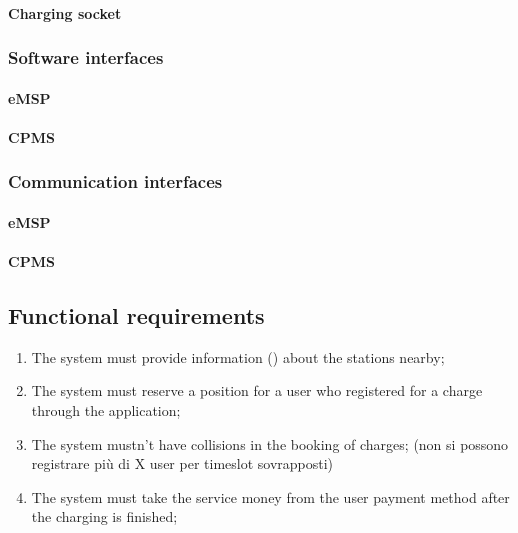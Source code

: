 \paragraph{\ac{Charging socket}}


\subsubsection{Software interfaces}
\paragraph{\ac{eMSP}}
\paragraph{\ac{CPMS}}

\subsubsection{Communication interfaces}
\paragraph{\ac{eMSP}}
\paragraph{\ac{CPMS}}

\subsection{Functional requirements}

\begin{enumerate}[label=\textbf{R\arabic*}]
    \item The system must provide information () about the stations nearby;
    \item The system must reserve a position for a user who registered for a charge through the application;
    \item The system mustn't have collisions in the booking of charges; (non si possono registrare più di X user per timeslot sovrapposti)
    \item The system must take the service money from the user payment method after the charging is finished;
\end{enumerate}
\clearpage
